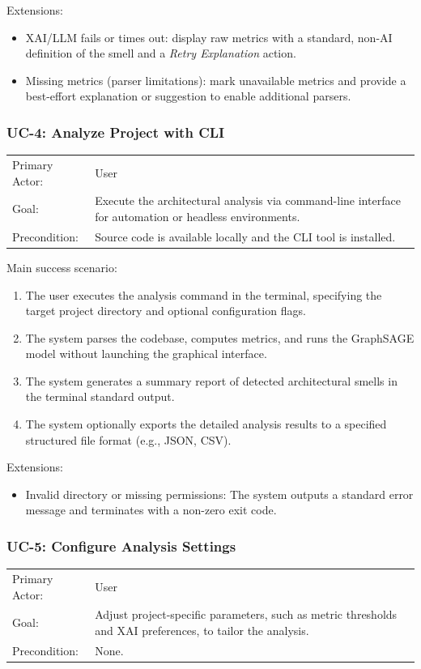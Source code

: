 Extensions:
\begin{itemize}
    \item XAI/LLM fails or times out: display raw metrics with a standard, non-AI definition of the smell and a \textit{Retry Explanation} action.
    \item Missing metrics (parser limitations): mark unavailable metrics and provide a best-effort explanation or suggestion to enable additional parsers.
\end{itemize}

\subsubsection{UC-4: Analyze Project with CLI}
\label{subsubsection:uc-4}
\begin{tabularx}{\textwidth}{@{}p{3.2cm}X@{}}
Primary Actor: & User \\
Goal: & Execute the architectural analysis via command-line interface for automation or headless environments. \\
Precondition: & Source code is available locally and the CLI tool is installed. \\
\end{tabularx}

Main success scenario:
\begin{enumerate}
    \item The user executes the analysis command in the terminal, specifying the target project directory and optional configuration flags.
    \item The system parses the codebase, computes metrics, and runs the GraphSAGE model without launching the graphical interface.
    \item The system generates a summary report of detected architectural smells in the terminal standard output.
    \item The system optionally exports the detailed analysis results to a specified structured file format (e.g., JSON, CSV).
\end{enumerate}

Extensions:
\begin{itemize}
    \item Invalid directory or missing permissions: The system outputs a standard error message and terminates with a non-zero exit code.
\end{itemize}

\subsubsection{UC-5: Configure Analysis Settings}
\label{subsubsection:uc-5}
\begin{tabularx}{\textwidth}{@{}p{3.2cm}X@{}}
Primary Actor: & User \\
Goal: & Adjust project-specific parameters, such as metric thresholds and XAI preferences, to tailor the analysis. \\
Precondition: & None. \\
\end{tabularx}

